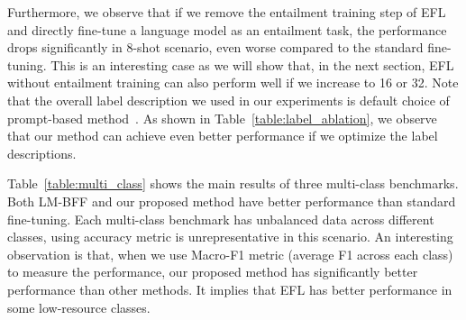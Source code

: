 \documentclass{article}
\begin{document}
Furthermore, we observe that if we remove the entailment training step of EFL and directly fine-tune a language model as an entailment task, the performance drops significantly in 8-shot scenario, even worse compared to the standard fine-tuning. This is an interesting case as we will show that, in the next section, EFL without entailment training can also perform well if we increase  to 16 or 32. Note that the overall label description we used in our experiments is default choice of prompt-based method~\citep{gao2020making}. As shown in Table~\ref{table:label_ablation}, we observe that our method can achieve even better performance if we optimize the label descriptions.

\begin{table*}[htb]
\centering
\renewcommand{\arraystretch}{1.1}
\caption{Our main few-shot learning results using RoBERTa-large on multi-class tasks. Besides accuracy metric, we also report macro-F1 metric since these multi-class datasets are unbalanced across different classes.}
\label{table:multi_class}
\end{table*}
Table~\ref{table:multi_class} shows the main results of three multi-class benchmarks. Both LM-BFF and our proposed method have better performance than standard fine-tuning. Each multi-class benchmark has unbalanced data across different classes, using accuracy metric is unrepresentative in this scenario. An interesting observation is that, when we use Macro-F1 metric (average F1 across each class) to measure the performance, our proposed method has significantly better performance than other methods. It implies that EFL has better performance in some low-resource classes.
\end{document}
